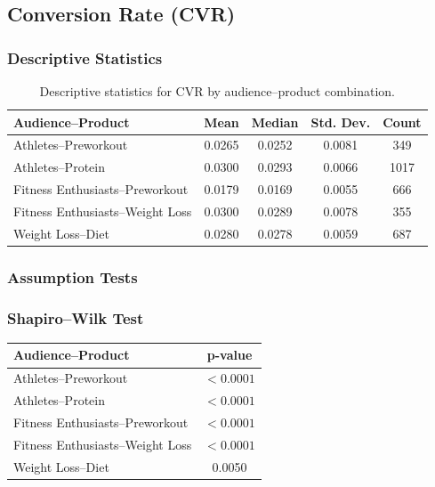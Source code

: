 \subsection{Conversion Rate (CVR)}\label{appendix:audience_product_performance_analysis_CVR}

\subsubsection{Descriptive Statistics}

\begin{table}[H]
	\centering
	\caption{Descriptive statistics for CVR by audience--product combination.}
	\begin{tabular}{lcccc}
		\toprule
		Audience--Product & Mean & Median & Std. Dev. & Count \\
		\midrule
		Athletes--Preworkout & 0.0265 & 0.0252 & 0.0081 & 349 \\
		Athletes--Protein & 0.0300 & 0.0293 & 0.0066 & 1017 \\
		Fitness Enthusiasts--Preworkout & 0.0179 & 0.0169 & 0.0055 & 666 \\
		Fitness Enthusiasts--Weight Loss & 0.0300 & 0.0289 & 0.0078 & 355 \\
		Weight Loss--Diet & 0.0280 & 0.0278 & 0.0059 & 687 \\
		\bottomrule
	\end{tabular}
\end{table}

\subsubsection{Assumption Tests}

\subsubsection{Shapiro--Wilk Test}

\begin{table}[H]
	\centering
	\begin{tabular}{lc}
		\toprule
		Audience--Product & p-value \\
		\midrule
		Athletes--Preworkout & $<0.0001$ \\
		Athletes--Protein & $<0.0001$ \\
		Fitness Enthusiasts--Preworkout & $<0.0001$ \\
		Fitness Enthusiasts--Weight Loss & $<0.0001$ \\
		Weight Loss--Diet & 0.0050 \\
		\bottomrule
	\end{tabular}
\end{table}

